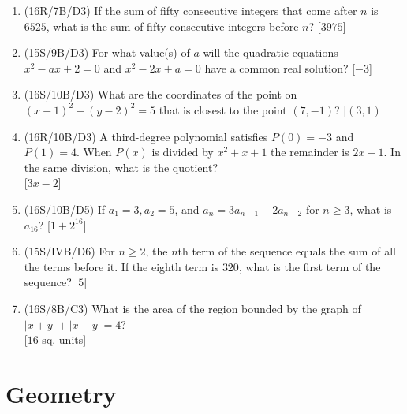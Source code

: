 \documentclass[11pt,paper=letter]{scrartcl}
\begin{document}
\begin{enumerate}
\item (16R/7B/D3) If the sum of fifty consecutive integers that come after $n$ is $6525$, what is the sum of fifty consecutive integers before $n$? \hfill [$3975$]

\item (15S/9B/D3) For what value(s) of $a$ will the quadratic equations $x^2 - ax + 2 = 0$ and $x^2 - 2x + a = 0$ have a common real solution? \hfill [$-3$]

\item (16S/10B/D3) What are the coordinates of the point on $(x - 1)^2 + (y - 2)^2 = 5$ that is closest to the point $(7 ,- 1)$? \hfill [$(3 , 1)$]

\item (16R/10B/D3) A third-degree polynomial satisfies $P(0) = -3$ and $P(1) = 4$. When $P(x)$ is divided by $x^2 + x + 1$ the remainder is $2x - 1$. In the same division, what is the quotient? \\ \phantom{.} \hfill [$3x - 2$]

\item (16S/10B/D5) If $a_1 = 3, a_2 = 5$, and $a_n = 3a_{n-1} - 2a_{n-2}$ for $n \geq 3$, what is $a_{16}$? \hfill [$1 + 2^{16}$]

\item (15S/IVB/D6) For $n \geq 2$, the $n$th term of the sequence equals the sum of all the terms before it. If the eighth term is $320$, what is the first term of the sequence? \hfill [$5$]

\item (16S/8B/C3) What is the area of the region bounded by the graph of $|x + y| + |x - y| = 4$? \\ \phantom{.} \hfill [$16$ sq. units]

\end{enumerate}

\section{Geometry}
\end{document}

